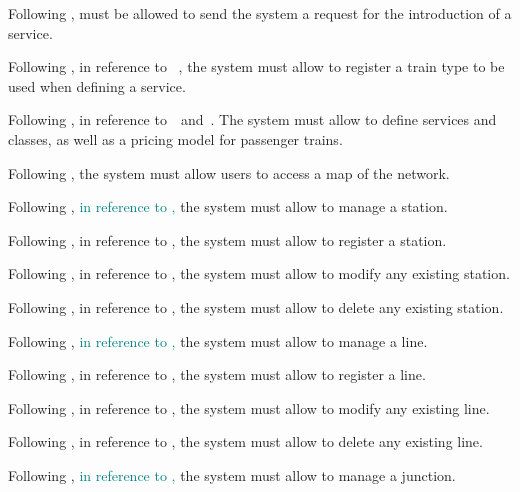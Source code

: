 Following ,  must be allowed to send the system a request for the introduction of a service.

Following , in reference to  , the system must allow  to register a train type to be used when defining a service.

Following , in reference to  and .  
The system must allow  to define services and classes, as well as a pricing model for passenger trains.

Following , the system must allow users to access a map of the network.

Following , \textcolor{teal}{in reference to ,} the system must allow  to manage a station.

Following , in reference to , the system must allow  to register a station.

Following , in reference to , the system must allow  to modify any existing station.

Following , in reference to , the system must allow  to delete any existing station.

Following , \textcolor{teal}{in reference to ,} the system must allow  to manage a line.

Following , in reference to , the system must allow  to register a line.  

Following , in reference to , the system must allow  to modify any existing line.  

Following , in reference to , the system must allow  to delete any existing line.

Following , \textcolor{teal}{in reference to ,} the system must allow  to manage a junction.

